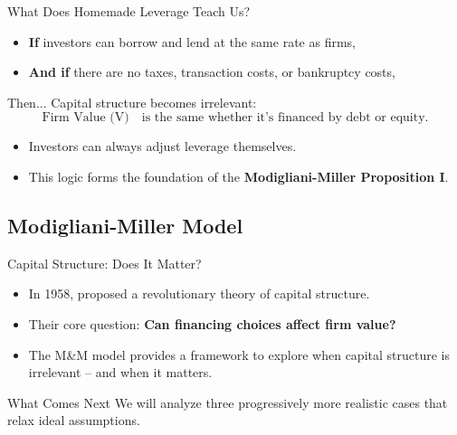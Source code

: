 \begin{frame}{What Does Homemade Leverage Teach Us?}
	
	\begin{itemize}
		\item \textbf{If} investors can borrow and lend at the same rate as firms,  
		\item \textbf{And if} there are no taxes, transaction costs, or bankruptcy costs,
	\end{itemize}
	
	\vspace{0.3cm}
	\begin{block}{Then...}
		Capital structure becomes irrelevant:  
		\[
		\text{Firm Value (V)} \quad \text{is the same whether it's financed by debt or equity.}
		\]
	\end{block}
	
	\vspace{0.2cm}
	\begin{itemize}
		\item Investors can always adjust leverage themselves.
		\item This logic forms the foundation of the \textbf{Modigliani-Miller Proposition I}.
	\end{itemize}
\end{frame}

\subsection{Modigliani-Miller Model}
\begin{frame}{Capital Structure: Does It Matter?}
	
	\begin{itemize}
		\item In 1958, \textcite{modigliani1958cost} proposed a revolutionary theory of capital structure.  
		\item Their core question: \textbf{Can financing choices affect firm value?}
		\item The M\&M model provides a framework to explore when capital structure is irrelevant -- and when it matters.
	\end{itemize}
	
	
	\vspace{0.2cm}
	\begin{alertblock}{What Comes Next}
		We will analyze three progressively more realistic cases that relax ideal assumptions.
	\end{alertblock}
	
\end{frame}


